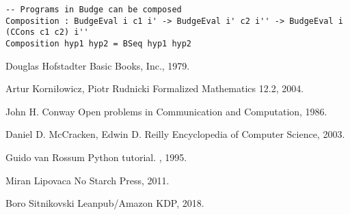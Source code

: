 \documentclass{article}
\begin{document}
\begin{lstlisting}
-- Programs in Budge can be composed
Composition : BudgeEval i c1 i' -> BudgeEval i' c2 i'' -> BudgeEval i (CCons c1 c2) i''
Composition hyp1 hyp2 = BSeq hyp1 hyp2
\end{lstlisting}

\begin{thebibliography}{1}

Douglas Hofstadter
\newblock Basic Books, Inc., 1979.

Artur Korniłowicz, Piotr Rudnicki
\newblock Formalized Mathematics 12.2, 2004.

John H. Conway
\newblock Open problems in Communication and Computation, 1986.

Daniel D. McCracken, Edwin D. Reilly
\newblock Encyclopedia of Computer Science, 2003.

Guido van Rossum
\newblock Python tutorial.
, 1995.

Miran Lipovaca
\newblock No Starch Press, 2011.

Boro Sitnikovski
\newblock Leanpub/Amazon KDP, 2018.

\end{thebibliography}
\end{document}
